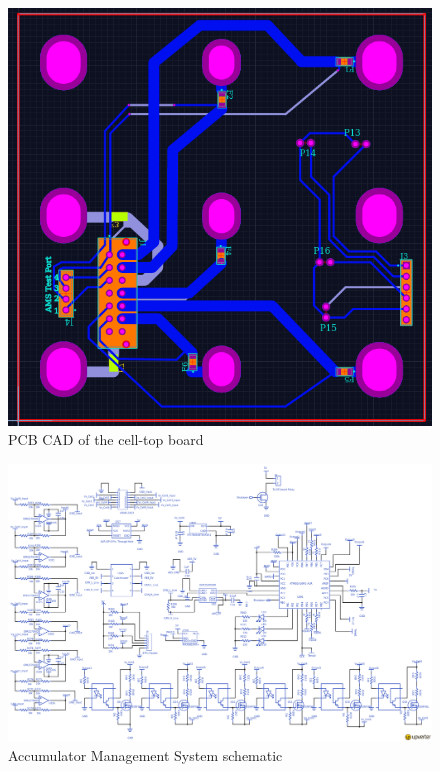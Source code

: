 \documentclass{article}
\begin{document}
        \begin{figure}[H]
            \centering
            \includegraphics[width = 0.8 \textwidth]{Cell-Top_Boards.png}
            \caption{PCB CAD of the cell-top board}
            \label{celltopboard}
        \end{figure}

                \begin{figure}
                    \includegraphics[width=\textheight]{bmsschem}
                    \caption{Accumulator Management System schematic}
                    \label{amsschem}
                \end{figure}

\end{document}
